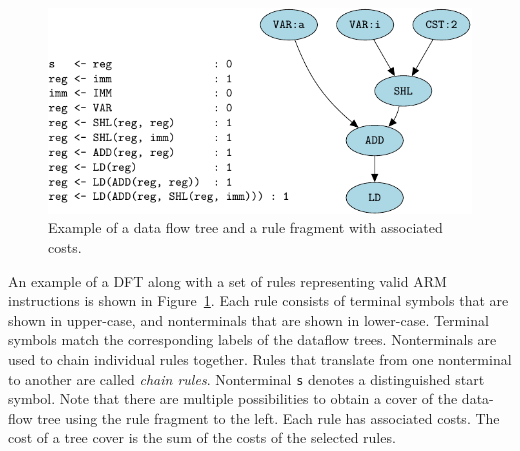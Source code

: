 \begin{figure}[ht]
  \begin{center}



    \includegraphics{fig/pgf-fig002}
  \end{center}
  \caption{Example of a data flow tree and a rule fragment with
    associated costs.}\label{fig:tpm}
\end{figure}

An example of a DFT along with a set of rules representing valid ARM
instructions is shown in Figure~\ref{fig:tpm}. Each rule consists of
terminal symbols that are shown in upper-case, and nonterminals that
are shown in lower-case. Terminal symbols match the corresponding
labels of the dataflow trees. Nonterminals are used to chain
individual rules together. Rules that translate from one nonterminal
to another are called \emph{chain rules}. Nonterminal \texttt{s}
denotes a distinguished start symbol. Note that there are multiple
possibilities to obtain a cover of the data-flow tree using the rule
fragment to the left. Each rule has associated costs. The cost of a
tree cover is the sum of the costs of the selected rules.

